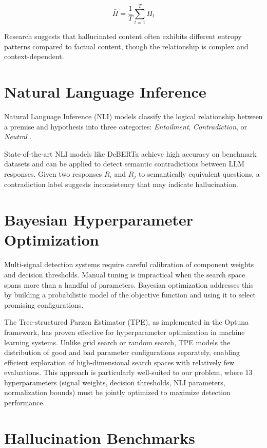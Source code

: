 \begin{equation}
    \bar{H} = \frac{1}{T} \sum_{t=1}^{T} H_t
\end{equation}

Research suggests that hallucinated content often exhibits different entropy patterns compared to factual content, though the relationship is complex and context-dependent.

\section{Natural Language Inference}

Natural Language Inference (NLI) models classify the logical relationship between a premise and hypothesis into three categories: \textit{Entailment}, \textit{Contradiction}, or \textit{Neutral} \cite{bowman2015large}.

State-of-the-art NLI models like DeBERTa \cite{he2021deberta} achieve high accuracy on benchmark datasets and can be applied to detect semantic contradictions between LLM responses. Given two responses $R_i$ and $R_j$ to semantically equivalent questions, a contradiction label suggests inconsistency that may indicate hallucination.

\section{Bayesian Hyperparameter Optimization}

Multi-signal detection systems require careful calibration of component weights and decision thresholds. Manual tuning is impractical when the search space spans more than a handful of parameters. Bayesian optimization addresses this by building a probabilistic model of the objective function and using it to select promising configurations.

The Tree-structured Parzen Estimator (TPE), as implemented in the Optuna framework, has proven effective for hyperparameter optimization in machine learning systems. Unlike grid search or random search, TPE models the distribution of good and bad parameter configurations separately, enabling efficient exploration of high-dimensional search spaces with relatively few evaluations. This approach is particularly well-suited to our problem, where 13 hyperparameters (signal weights, decision thresholds, NLI parameters, normalization bounds) must be jointly optimized to maximize detection performance.

\section{Hallucination Benchmarks}

